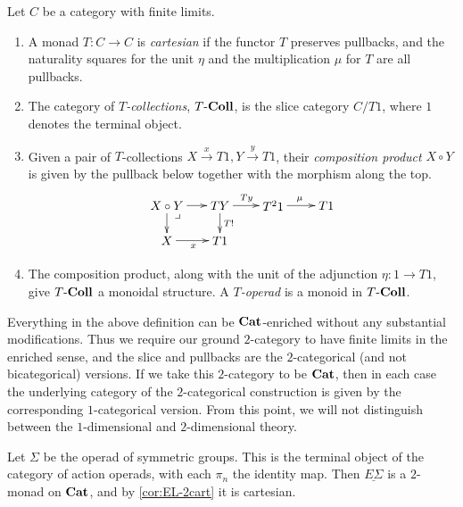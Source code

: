 \begin{Defi}\label{Defi:Tcoll-op}
Let $C$ be a category with finite limits.
\begin{enumerate}
\item A monad $T \colon C \rightarrow C$ is \textit{cartesian} if the functor $T$ preserves pullbacks, and the naturality squares for the unit $\eta$ and the multiplication $\mu$ for $T$ are all pullbacks.
\item The category of \textit{$T$-collections}, $T\mbox{-}\mathbf{Coll}$, is the slice category $C/T1$, where $1$ denotes the terminal object.
\item Given a pair of $T$-collections $X \stackrel{x}{\rightarrow} T1, Y \stackrel{y}{\rightarrow} T1$, their \textit{composition product} $X \circ Y$ is given by the pullback below together with the morphism along the top.
  \[
    \xy
      (0,0)*+{X \circ Y} ="00";
      (15,0)*+{TY} ="10";
      (30,0)*+{T^{2}1} ="20";
      (45,0)*+{T1} ="30";
      (0,-10)*+{X} ="01";
      (15,-10)*+{T1} ="11";
      {\ar^{} "00" ; "10"};
      {\ar^{Ty} "10" ; "20"};
      {\ar^{\mu} "20" ; "30"};
      {\ar^{T!} "10" ; "11"};
      {\ar_{x} "01" ; "11"};
      {\ar^{} "00" ; "01"};
      (3,-3)*{\lrcorner};
    \endxy
  \]
\item The composition product, along with the unit of the adjunction $\eta \colon 1 \rightarrow T1$, give $T\mbox{-}\mathbf{Coll}$ a monoidal structure. A \textit{$T$-operad} is a monoid in $T\mbox{-}\mathbf{Coll}$.
\end{enumerate}
\end{Defi}

\begin{rem}
Everything in the above definition can be $\mathbf{Cat}$-enriched without any substantial modifications. Thus we require our ground $2$-category to have finite limits in the enriched sense, and the slice and pullbacks are the $2$-categorical (and not bicategorical) versions. If we take this $2$-category to be $\mathbf{Cat}$, then in each case the underlying category of the $2$-categorical construction is given by the corresponding $1$-categorical version. From this point, we will not distinguish between the $1$-dimensional and $2$-dimensional theory. 
\end{rem}

Let $\Sigma$ be the operad of symmetric groups. This is the terminal object of the category of action operads, with each $\pi_{n}$ the identity map. Then $\underline{E\Sigma}$ is a $2$-monad on $\mathbf{Cat}$, and by \cref{cor:EL-2cart} it is cartesian.

